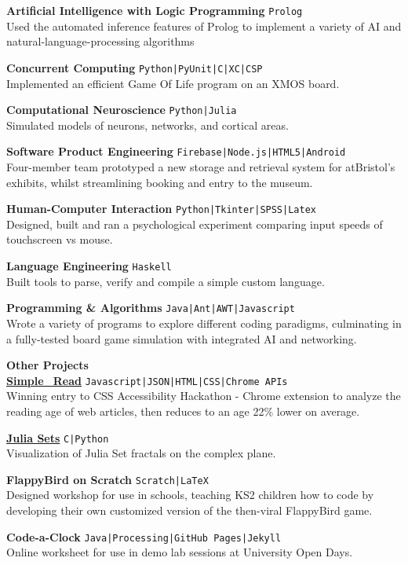 \documentclass[10pt]{article}
\newcommand{\sect}[1]{{\LARGE{\textbf{#1}}}\vspace{0.1em}\\}
\newcommand{\zz}[3]{{\large\textbf{#1}} \hfill {\small \colorbox{boxcol}{\texttt{#3}} }\\{#2}\vspace{0.5em}}
\newcommand{\li}{\textcolor{linecol}{|}}
\begin{document}
\begin{minipage}[t]{0.66\textwidth}
\zz{Artificial Intelligence with Logic Programming}
{Used the automated inference features of Prolog to implement a variety of AI and natural-language-processing algorithms}{Prolog}

\zz{Concurrent Computing}
{Implemented an efficient Game Of Life program on an XMOS board.}{Python\li PyUnit\li C\li XC\li CSP}

\zz{Computational Neuroscience}
{Simulated models of neurons, networks, and cortical areas.}{Python\li Julia}

\zz{Software Product Engineering}
{Four-member team prototyped a new storage and retrieval system for atBristol's exhibits, whilst streamlining booking and entry to the museum.}{Firebase\li Node.js\li HTML5\li Android}

\zz{Human-Computer Interaction}
{Designed, built and ran a psychological experiment comparing input speeds of touchscreen vs mouse.}{Python\li Tkinter\li SPSS\li Latex}

\zz{Language Engineering}
{Built tools to parse, verify and compile a simple custom language.}{Haskell}

\zz{Programming \& Algorithms}
{Wrote a variety of programs to explore different coding paradigms, culminating in a fully-tested board game simulation with integrated AI and networking.}{Java\li Ant\li AWT\li Javascript}
\\




\vspace{0.5em}


\sect{Other Projects}
\zz{\href{https://github.com/LukeStorry/simple_read}{Simple\_Read}}
{Winning entry to CSS Accessibility Hackathon - Chrome extension to analyze the reading age of web articles, then reduces to an age 22\% lower on average.}{Javascript\li JSON\li HTML\li CSS\li Chrome APIs}

\zz{\href{https://github.com/LukeStorry/Juliasets}{Julia Sets}}{Visualization of Julia Set fractals on the complex plane.}{C\li Python}

\zz{FlappyBird on Scratch}{Designed workshop for use in schools, teaching KS2 children how to code by developing their own customized version of the then-viral FlappyBird game.}{Scratch\li LaTeX}

\zz{Code-a-Clock}{Online worksheet for use in demo lab sessions at University Open Days.}{Java\li Processing\li GitHub Pages\li Jekyll}


\end{minipage} 
\end{document}
